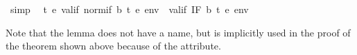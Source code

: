 \begin{isabellebody}
\isamarkuptrue%
\isamarkupfalse%
\ {}simp{}{}\isanewline
\ \ {}{}t\ e{}\ valif\ {}normif\ b\ t\ e{}\ env\ {}\ valif\ {}IF\ b\ t\ e{}\ env{}%
\isadelimproof
%
\endisadelimproof
%
\isatagproof
%
\endisatagproof
{\isafoldproof}%
%
\isadelimproof
%
\endisadelimproof
%
\isadelimproof
%
\endisadelimproof
%
\isatagproof
%
\endisatagproof
{\isafoldproof}%
%
\isadelimproof
%
\endisadelimproof
%
\begin{isamarkuptext}%
\noindent
Note that the lemma does not have a name, but is implicitly used in the proof
of the theorem shown above because of the  attribute.


\end{isamarkuptext}
\end{isabellebody}

